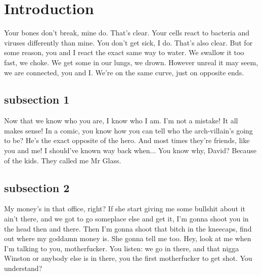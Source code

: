 \section{Introduction}

Your bones don't break, mine do. That's clear. Your cells react to bacteria and viruses differently than mine. You don't get sick, I do. That's also clear. But for some reason, you and I react the exact same way to water. We swallow it too fast, we choke. We get some in our lungs, we drown. However unreal it may seem, we are connected, you and I. We're on the same curve, just on opposite ends.

\subsection{subsection 1}
Now that we know who you are, I know who I am. I'm not a mistake! It all makes sense! In a comic, you know how you can tell who the arch-villain's going to be? He's the exact opposite of the hero. And most times they're friends, like you and me! I should've known way back when... You know why, David? Because of the kids. They called me Mr Glass.

\subsection{subsection 2}
My money's in that office, right? If she start giving me some bullshit about it ain't there, and we got to go someplace else and get it, I'm gonna shoot you in the head then and there. Then I'm gonna shoot that bitch in the kneecaps, find out where my goddamn money is. She gonna tell me too. Hey, look at me when I'm talking to you, motherfucker. You listen: we go in there, and that nigga Winston or anybody else is in there, you the first motherfucker to get shot. You understand?